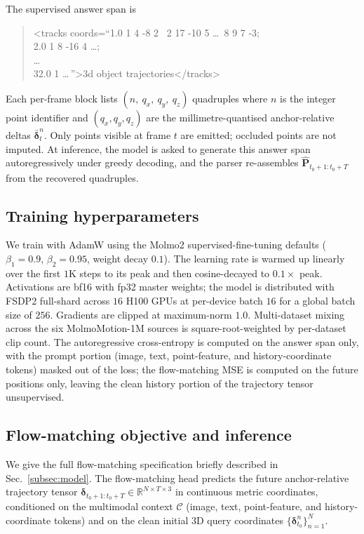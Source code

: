 \documentclass{llmxive}
\begin{document}
The supervised answer span is

\begin{quote}\small\ttfamily
<tracks coords=``1.0 1 4 -8 2 \ 2 17 -10 5 \ldots\ 8 9 7 -3;\\
\hphantom{<tracks coords=``}2.0 1 8 -16 4 \ldots;\\
\hphantom{<tracks coords=``}\ldots\\
\hphantom{<tracks coords=``}32.0 1 \ldots\,''>3d object trajectories</tracks>
\end{quote}

Each per-frame block lists $(n,\ q_x,\ q_y,\ q_z)$ quadruples where $n$ is the
integer point identifier and $(q_x,q_y,q_z)$ are the millimetre-quantised
anchor-relative deltas $\bar{\boldsymbol{\delta}}_{t}^{n}$. Only points visible at frame $t$
are emitted; occluded points are not imputed. At inference, the model is asked
to generate this answer span autoregressively under greedy decoding, and the
parser re-assembles $\hat{\mathbf{P}}_{t_0+1:t_0+T}$ from the recovered
quadruples.

\subsection{Training hyperparameters}
\label{appsec:training}

We train with AdamW using the Molmo2 supervised-fine-tuning defaults
($\beta_1=0.9$, $\beta_2=0.95$, weight decay $0.1$). The learning rate is
warmed up linearly over the first $1$K steps to its peak and then cosine-decayed
to $0.1\times$ peak. Activations are bf16 with fp32 master weights; the model is
distributed with FSDP2 full-shard across $16$ H100 GPUs at per-device batch $16$
for a global batch size of $256$. Gradients are clipped at maximum-norm $1.0$.
Multi-dataset mixing across the six MolmoMotion-1M sources is square-root-weighted
by per-dataset clip count. The autoregressive cross-entropy is computed on the
answer span only, with the prompt portion (image, text, point-feature, and
history-coordinate tokens) masked out of the loss; the flow-matching MSE is
computed on the future positions only, leaving the clean history portion of
the trajectory tensor unsupervised.

\subsection{Flow-matching objective and inference}
\label{appsec:flowmatching}

We give the full flow-matching specification briefly described in
Sec.~\ref{subsec:model}. The flow-matching head predicts the future
anchor-relative trajectory tensor
$\boldsymbol{\delta}_{t_0+1:t_0+T} \in \mathbb{R}^{N \times T \times 3}$
in continuous metric coordinates, conditioned on the multimodal context
$\mathcal{C}$ (image, text, point-feature, and history-coordinate tokens) and
on the clean initial 3D query coordinates
$\{\boldsymbol{\delta}_{t_0}^{n}\}_{n=1}^{N}$.
\end{document}
